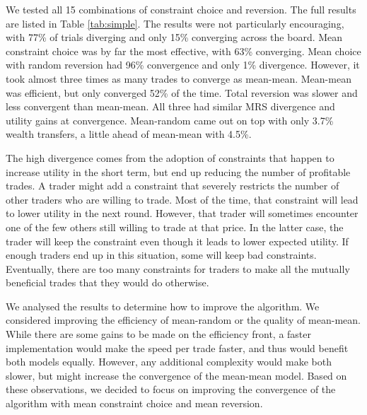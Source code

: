 \documentclass[12pt,a4paper,titlepage]{article}
\newcommand{\co}[1]{\textsf{#1}}
\begin{document}
We tested all 15 combinations of constraint choice and reversion.
The full results are listed in Table \ref{tab:simple}.
The results were not particularly encouraging, with 77\% of trials diverging and only 15\% converging across the board.
\co{Mean} constraint choice was by far the most effective, with 63\% converging.
\co{Mean} choice with \co{random} reversion had 96\% convergence and only 1\% divergence.
However, it took almost three times as many trades to converge as \co{mean}-\co{mean}.
\co{Mean}-\co{mean} was efficient, but only converged 52\% of the time.
\co{Total} reversion was slower and less convergent than \co{mean}-\co{mean}.
All three had similar MRS divergence and utility gains at convergence.
\co{Mean}-\co{random} came out on top with only 3.7\% wealth transfers, a little ahead of \co{mean}-\co{mean} with 4.5\%.

The high divergence comes from the adoption of constraints that happen to increase utility in the short term, but end up reducing the number of profitable trades.
A trader might add a constraint that severely restricts the number of other traders who are willing to trade.
Most of the time, that constraint will lead to lower utility in the next round.
However, that trader will sometimes encounter one of the few others still willing to trade at that price.
In the latter case, the trader will keep the constraint even though it leads to lower expected utility.
If enough traders end up in this situation, some will keep bad constraints.
Eventually, there are too many constraints for traders to make all the mutually beneficial trades that they would do otherwise.

We analysed the results to determine how to improve the algorithm.
We considered improving the efficiency of \co{mean}-\co{random} or the quality of \co{mean}-\co{mean}.
While there are some gains to be made on the efficiency front, a faster implementation would make the speed per trade faster, and thus would benefit both models equally.
However, any additional complexity would make both slower, but might increase the convergence of the \co{mean}-\co{mean} model.
Based on these observations, we decided to focus on improving the convergence of the algorithm with \co{mean} constraint choice and \co{mean} reversion.
\end{document}
